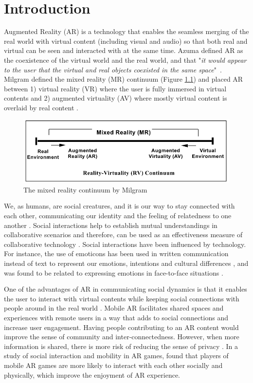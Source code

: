 \chapter{Introduction}
\label{ch:intro}

Augmented Reality (AR) is a technology that enables the seamless merging of the real world with virtual content (including visual and audio) so that both real and virtual can be seen and interacted with at the same time. Azuma defined AR as the coexistence of the virtual world and the real world, and that "\textit{it would appear to the user that the virtual and real objects coexisted in the same space}"~\cite{azuma1997survey}. Milgram defined the mixed reality (MR) continuum (Figure \ref{fig:mr-continuum}) and placed AR between 1) virtual reality (VR) where the user is fully immersed in virtual contents and 2) augmented virtuality (AV) where mostly virtual content is overlaid by real content \cite{Milgram1995a}. 

\begin{figure}
    \centering
    \includegraphics[width=.8\linewidth]{images/mixed-reality-continuum.png}
    \caption{The mixed reality continuum by Milgram \cite{Milgram1995a}}
    \label{fig:mr-continuum}
\end{figure}

We, as humans, are social creatures, and it is our way to stay connected with each other, communicating our identity and the feeling of relatedness to one another \cite{HuangWeidong2013}. Social interactions help to establish mutual understandings in collaborative scenarios and therefore, can be used as an effectiveness measure of collaborative technology \cite{Li2013}. Social interactions have been influenced by technology. For instance, the use of emoticons has been used in written communication instead of text to represent our emotions, intentions and cultural differences \cite{Pavalanathan2016}, and was found to be related to expressing emotions in face-to-face situations \cite{Derks2007}. 

One of the advantages of AR in communicating social dynamics is that it enables the user to interact with virtual contents while keeping social connections with people around in the real world \cite{HuangWeidong2013}. Mobile AR facilitates shared spaces and experiences with remote users in a way that adds to social connections and increase user engagement. Having people contributing to an AR content would improve the sense of community and inter-connectedness. However, when more information is shared, there is more risk of reducing the sense of privacy \cite{Olsson2013}. In a study of social interaction and mobility in AR games, \textcite{Schmalstieg_144} found that players of mobile AR games are more likely to interact with each other socially and physically, which improve the enjoyment of AR experience. 


